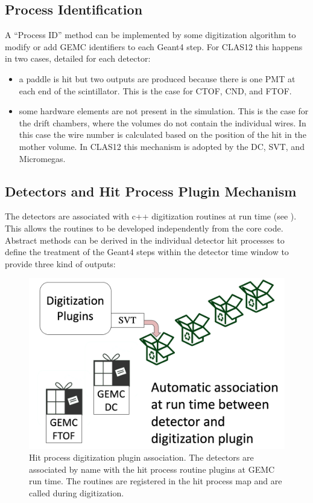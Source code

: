 \subsection{Process Identification}

A ``Process ID'' method can be implemented by some digitization algorithm to modify or add GEMC identifiers to each Geant4 step. For CLAS12 this happens in two
cases, detailed for each detector:

\begin{itemize}
	\item a paddle is hit but two outputs are produced because there is one PMT at each end of the scintillator. This
          is the case for CTOF, CND, and FTOF.
    \item some hardware elements are not present in the simulation. This is the case for the drift chambers, where the volumes do not contain
          the individual wires. In this case the wire number is calculated based on the position of the hit in the mother volume. In CLAS12 this mechanism
          is adopted by the DC, SVT, and Micromegas.
\end{itemize}


\subsection{Detectors and Hit Process Plugin Mechanism}

The detectors are associated with c++ digitization routines at run time (see ).
This allows the routines to be developed independently from the core code. Abstract methods can be derived in
the individual detector hit processes to define the treatment of the Geant4 steps within the detector
time window to provide three kind of outputs:

\begin{figure}
	\centering
	\includegraphics[width=1.0\columnwidth,keepaspectratio]{img/pluginsAssociation.png}
	\caption{Hit process digitization plugin association. The detectors are associated by name with the hit process routine
             plugins at GEMC run time. The routines are registered in the hit process map and are called during digitization.}
	\label{fig:pluginsAssociation}
\end{figure}


